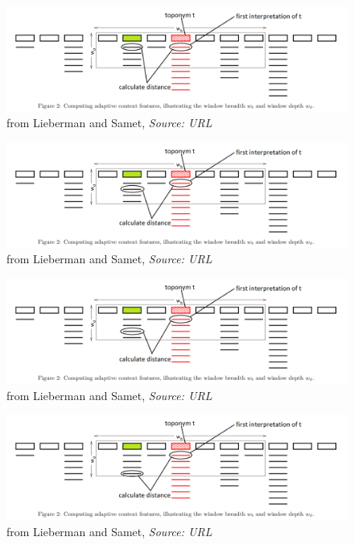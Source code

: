 \documentclass{beamer}
\begin{document}
{\begin{overprint}
		\begin{figure}
			\includegraphics[width=\textwidth]{adaptive-proximity-d.png} 
			\caption{from Lieberman and Samet, \textit{Source: URL}}
		\end{figure}
		
		\begin{figure}
			\includegraphics[width=\textwidth]{adaptive-proximity-e.png} 
			\caption{from Lieberman and Samet, \textit{Source: URL}}
		\end{figure}
		
		\begin{figure}
			\includegraphics[width=\textwidth]{adaptive-proximity-f.png} 
			\caption{from Lieberman and Samet, \textit{Source: URL}}
		\end{figure}
		
		\begin{figure}
			\includegraphics[width=\textwidth]{adaptive-proximity-g.png} 
			\caption{from Lieberman and Samet, \textit{Source: URL}}
		\end{figure}
		

\end{overprint}}
\end{document}

